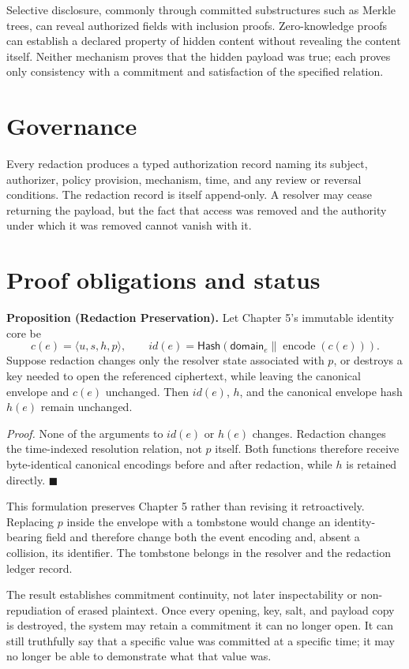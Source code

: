 \documentclass[11pt,openany]{book}
\newcommand{\Hash}{\mathsf{Hash}}
\begin{document}
Selective disclosure, commonly through committed substructures such as Merkle
trees, can reveal authorized fields with inclusion proofs. Zero-knowledge
proofs can establish a declared property of hidden content without revealing
the content itself. Neither mechanism proves that the hidden payload was true;
each proves only consistency with a commitment and satisfaction of the
specified relation.

\section{Governance}
Every redaction produces a typed authorization record naming its subject,
authorizer, policy provision, mechanism, time, and any review or reversal
conditions. The redaction record is itself append-only. A resolver may cease
returning the payload, but the fact that access was removed and the authority
under which it was removed cannot vanish with it.

\section{Proof obligations and status}
\textbf{Proposition (Redaction Preservation).} Let Chapter 5's immutable
identity core be
\[
 c(e)=\langle u,s,h,p\rangle,
 \qquad
 id(e)=\Hash(\mathsf{domain}_e\parallel\operatorname{encode}(c(e))).
\]
Suppose redaction changes only the resolver state associated with \(p\), or
destroys a key needed to open the referenced ciphertext, while leaving the
canonical envelope and \(c(e)\) unchanged. Then \(id(e)\), \(h\), and the
canonical envelope hash \(h(e)\) remain unchanged.

\emph{Proof.} None of the arguments to \(id(e)\) or \(h(e)\) changes.
Redaction changes the time-indexed resolution relation, not \(p\) itself.
Both functions therefore receive byte-identical canonical encodings before
and after redaction, while \(h\) is retained directly. \(\blacksquare\)

This formulation preserves Chapter 5 rather than revising it retroactively.
Replacing \(p\) inside the envelope with a tombstone would change an
identity-bearing field and therefore change both the event encoding and,
absent a collision, its identifier. The tombstone belongs in the resolver and
the redaction ledger record.

The result establishes commitment continuity, not later inspectability or
non-repudiation of erased plaintext. Once every opening, key, salt, and payload
copy is destroyed, the system may retain a commitment it can no longer open.
It can still truthfully say that a specific value was committed at a specific
time; it may no longer be able to demonstrate what that value was.
\end{document}
